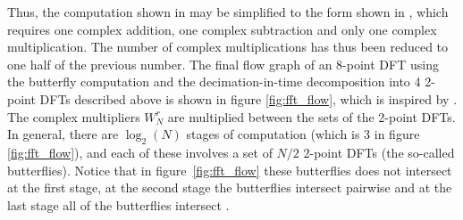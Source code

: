 Thus, the computation shown in \cite{figure 8, DTSP} may be simplified to the form shown in \cite{figure 10, DTSP}, which requires one complex addition, one complex subtraction and only one complex multiplication. The number of complex multiplications has thus been reduced to one half of the previous number. The final flow graph of an 8-point DFT using the butterfly computation and the decimation-in-time decomposition into 4 2-point DFTs described above is shown in figure \ref{fig:fft_flow}, which is inspired by \cite{figure 11, DTSP}. The complex multipliers $W_N^r$ are multiplied between the sets of the 2-point DFTs.
\\
In general, there are $\log_2(N)$ stages of computation (which is 3 in figure \ref{fig:fft_flow}), and each of these involves a set of $N/2$ 2-point DFTs (the so-called butterflies). Notice that in figure~\ref{fig:fft_flow} these butterflies does not intersect at the first stage, at the second stage the butterflies intersect pairwise and at the last stage all of the butterflies intersect .
